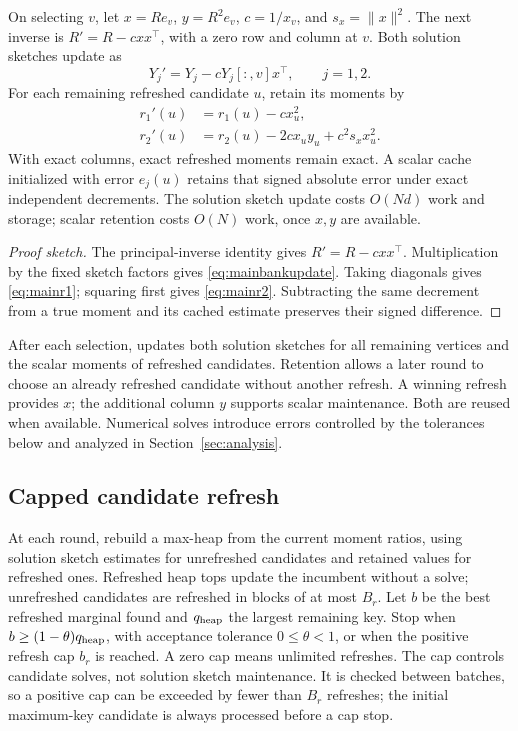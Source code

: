 \begin{proposition}\label{main:maintenance}
On selecting $v$, let $x=Re_v$, $y=R^2e_v$, $c=1/x_v$,
and $s_x=\|x\|^2$. The next inverse is
$R'=R-cxx^\top$, with a zero row and column at $v$.
Both solution sketches update as
\begin{equation}\label{eq:mainbankupdate}
 Y_j'=Y_j-cY_j[:,v]x^\top,\qquad j=1,2.
\end{equation}
For each remaining refreshed candidate $u$, retain its moments by
\begin{align}
 r_1'(u)&=r_1(u)-cx_u^2,\label{eq:mainr1}\\
 r_2'(u)&=r_2(u)-2cx_uy_u+c^2s_x x_u^2.\label{eq:mainr2}
\end{align}
With exact columns, exact refreshed moments remain exact. A scalar
cache initialized with error $e_j(u)$ retains that signed absolute
error under exact independent decrements.
The solution sketch update costs $O(Nd)$ work and storage; scalar retention
costs $O(N)$ work, once $x,y$ are available.
\end{proposition}
\begin{proof}[Proof sketch]
The principal-inverse identity gives $R'=R-cxx^\top$.
Multiplication by the fixed sketch factors gives
\eqref{eq:mainbankupdate}. Taking diagonals gives
\eqref{eq:mainr1}; squaring first gives \eqref{eq:mainr2}.
Subtracting the same decrement from a true moment and its cached
estimate preserves their signed difference.
\end{proof}

After each selection, \alg{} updates both solution sketches for all remaining
vertices and the scalar moments of refreshed candidates. Retention
allows a later round to choose an already refreshed candidate without
another refresh. A winning refresh provides $x$; the additional
column $y$ supports scalar maintenance. Both are reused when available.
Numerical solves introduce errors controlled by the tolerances below
and analyzed in Section~\ref{sec:analysis}.

\subsection{Capped candidate refresh}
At each round, rebuild a max-heap from the current moment ratios,
using solution sketch estimates for unrefreshed candidates and retained values
for refreshed ones. Refreshed heap tops update the incumbent without
a solve; unrefreshed candidates are refreshed in blocks of at most
$B_r$. Let $b$ be the best refreshed marginal found and $q_{\rm heap}$ the
largest remaining key. Stop when $b\geq(1-\theta)q_{\rm heap}$, with
acceptance tolerance $0\leq\theta<1$, or when the positive refresh
cap $b_r$ is reached. A zero cap means unlimited refreshes.
The cap controls candidate solves, not solution sketch maintenance. It is checked
between batches, so a positive cap can be exceeded by fewer than
$B_r$ refreshes; the initial maximum-key candidate is always processed
before a cap stop.

